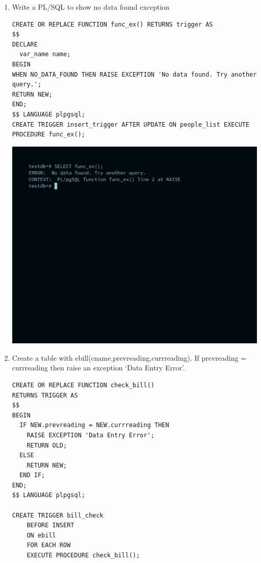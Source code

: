 \documentclass[10pt,a4paper,titlepage]{report}
\begin{document}
{\begin{enumerate}
	\item Write a PL/SQL to show no data found exception
	\begin{verbatim}
CREATE OR REPLACE FUNCTION func_ex() RETURNS trigger AS
$$
DECLARE
  var_name name;
BEGIN
WHEN NO_DATA_FOUND THEN RAISE EXCEPTION 'No data found. Try another query.';
RETURN NEW;
END;
$$ LANGUAGE plpgsql;
CREATE TRIGGER insert_trigger AFTER UPDATE ON people_list EXECUTE PROCEDURE func_ex();

	\end{verbatim}
	\includegraphics[width=\linewidth]{../Images/Triggers/6.png}


	\item Create a table with ebill(cname,prevreading,currreading). If prevreading = currreading then raise an exception ‘Data Entry Error’.
	\begin{verbatim}
CREATE OR REPLACE FUNCTION check_bill()
RETURNS TRIGGER AS
$$
BEGIN
  IF NEW.prevreading = NEW.currreading THEN
    RAISE EXCEPTION 'Data Entry Error';
    RETURN OLD;
  ELSE
    RETURN NEW;
  END IF;
END;
$$ LANGUAGE plpgsql;

CREATE TRIGGER bill_check
	BEFORE INSERT
	ON ebill
	FOR EACH ROW
	EXECUTE PROCEDURE check_bill();

\end{verbatim}


\end{enumerate}}
\end{document}
